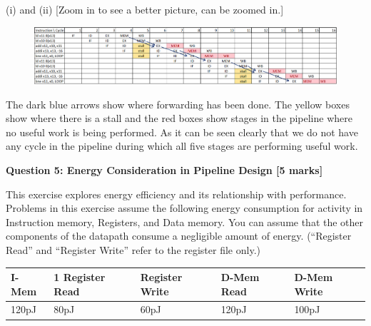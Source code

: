 \documentclass[addpoints]{exam}
\begin{document}
\begin{sloppypar}
\begin{questions}
    \begin{EnvFullwidth}
        \begin{solution}
            (i) and (ii) [Zoom in to see a better picture, can be zoomed in.]
            \begin{figure}[H]
                \centering
                \includegraphics[scale = 0.4775]{q4_ans_i.png}
            \end{figure}
            The dark blue arrows show where forwarding has been done. The yellow boxes show where there is a stall and the red boxes show stages in the pipeline where no useful work is being performed. As it can be seen clearly that we do not have any cycle in the pipeline during which all five stages are performing useful work.
        \end{solution}    
    \end{EnvFullwidth}
    
    \question[5]
    \begin{center}
        \textbf{Question 5: Energy Consideration in Pipeline Design [5 marks]}
    \end{center}

    This exercise explores energy efficiency and its relationship with performance. Problems in this exercise assume the following energy consumption for activity in Instruction memory, Registers, and Data memory. You can assume that the other components of the datapath consume a negligible amount of energy. (“Register Read” and “Register Write” refer to the register file only.)

    \begin{tabular}{| l | l | l | l | l |}
        \hline
        I-Mem \hspace*{4.5mm}& 1 Register Read\hspace*{4.5mm} & Register Write\hspace*{4.5mm} & D-Mem Read\hspace*{4.5mm} & D-Mem Write\hspace*{4.5mm} \\ \hline
        120pJ & 80pJ & 60pJ & 120pJ & 100pJ \\ \hline 
    \end{tabular}


\end{questions}
\end{sloppypar}
\end{document}
